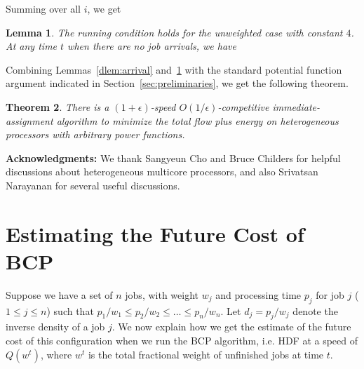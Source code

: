 \documentclass[11pt]{article}
\newtheorem{lemma}{Lemma}[section]
\newtheorem{theorem}[lemma]{Theorem}
\begin{document}
Summing over all $i$, we
get
\begin{lemma}
  \label{dlem:running}
  The running condition holds for the unweighted case with constant $4$.
  At any time $t$ when there are no job arrivals, we have
\end{lemma}
Combining Lemmas~\ref{dlem:arrival} and~\ref{dlem:running} with the
standard potential function argument indicated in
Section~\ref{sec:preliminaries}, we get the following theorem.
\begin{theorem}
  \label{dthm:unwtd}
  There is a $(1+\epsilon)$-speed $O(1/\epsilon)$-competitive
  immediate-assignment algorithm to minimize the total flow plus energy on
  heterogeneous processors with arbitrary power functions.
\end{theorem}


\bigskip
\noindent
{\bf Acknowledgments:} We thank Sangyeun Cho and Bruce Childers for helpful discussions
about heterogeneous multicore processors, and also Srivatsan Narayanan for several useful discussions.






\appendix

\section{Estimating the Future Cost of BCP}
\label{sec:cost-estimate}
Suppose we have a set of $n$ jobs, with weight $w_j$ and processing time
$p_j$ for job $j$ ($1 \leq j \leq n$) such that $p_1/w_1 \leq p_2/w_2 \leq \ldots \leq p_n/w_n$. Let $d_j = p_j/w_j$ denote the inverse density of a job $j$.
We now explain how we get the estimate of the future cost of this configuration
when we run the BCP algorithm, i.e. HDF at a speed of $Q(w^t)$, where $w^t$ is the total fractional weight
of unfinished jobs at time $t$.
\end{document}
